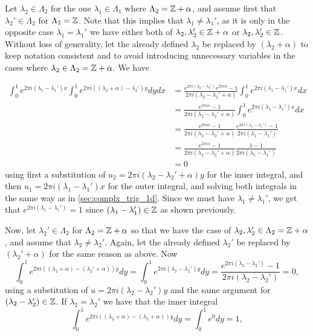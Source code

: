 \documentclass[../thesis.tex]{subfiles}
\begin{document}
Let $\lambda_2\in \Lambda_2$ for the one $\lambda_1\in\Lambda_1$ where $\Lambda_2=\mathbb{Z}+\alpha$, and assume first that $\lambda_2'\in \Lambda_2$ for $\Lambda_2 = \mathbb{Z}$. Note that this implies that $\lambda_1\neq\lambda_1'$, as it is only in the opposite case $\lambda_1 = \lambda_1'$ we have either both of $\lambda_2,\lambda_2' \in \mathbb{Z}+\alpha$ or $\lambda_2,\lambda_2' \in \mathbb{Z}$. Without loss of generality, let the already defined $\lambda_2$ be replaced by $(\lambda_2+\alpha)$ to keep notation consistent and to avoid introducing unnecessary variables in the cases where $\lambda_2 \in \Lambda_2 = \mathbb{Z}+\alpha$. We have

\begin{align*}
    \int_0^1e^{2\pi i  (\lambda_1- \lambda_1')x}\int_0^1  e^{2\pi i  ((\lambda_2+\alpha) - \lambda_2')y} dydx 
    &= \frac{e^{2\pi i (\lambda_2-\lambda_2')}e^{2\pi i \alpha}-1}{2\pi i (\lambda_2-\lambda_2'+\alpha)} \int_0^1e^{2\pi i  (\lambda_1- \lambda_1')x}dx\\ 
    &= \frac{e^{2\pi i \alpha}-1}{2\pi i (\lambda_2-\lambda_2'+\alpha)} \int_0^1e^{2\pi i  (\lambda_1- \lambda_1')x} dx\\ 
    &= \frac{e^{2\pi i \alpha}-1}{2\pi i (\lambda_2-\lambda_2'+\alpha)} \frac{e^{2\pi i (\lambda_1- \lambda_1')}-1}{2\pi i (\lambda_1- \lambda_1')}\\
    &= \frac{e^{2\pi i \alpha}-1}{2\pi i (\lambda_2-\lambda_2'+\alpha)} \frac{1-1}{2\pi i (\lambda_1- \lambda_1')}\\
    &= 0 
\end{align*}
using first a substitution of $u_2=2 \pi i (\lambda_2-\lambda_2'+\alpha)y$ for the inner integral, and then $u_1=2 \pi i (\lambda_1-\lambda_1')x$ for the outer integral, and solving both integrals in the same way as in \cref{sec:complx_trig_1d}. Since we must have $\lambda_1 \neq \lambda_1'$, we get that $e^{2\pi i (\lambda_1-\lambda_1')} = 1$ since $(\lambda_1-\lambda_1')\in \mathbb{Z}$ as shown previously. 


Now, let $\lambda_2'\in \Lambda_2$ for $\Lambda_2=\mathbb{Z}+\alpha$ so that we have the case of $\lambda_2,\lambda_2'\in \Lambda_2= \mathbb{Z}+\alpha$, and assume that $\lambda_2\neq\lambda_2'$. Again, let the already defined $\lambda_2'$ be replaced by $(\lambda_2'+\alpha)$ for the same reason as above. Now
\begin{equation*}
    \int_0^1  e^{2\pi i ((\lambda_2+\alpha) - (\lambda_2'+\alpha))y} dy = \int_0^1 e^{2\pi i  (\lambda_2 - \lambda_2')y} dy = \frac{e^{2\pi i (\lambda_2- \lambda_2')}-1}{2\pi i (\lambda_2- \lambda_2')} =0,
\end{equation*}
using a substitution of $u=2\pi i (\lambda_2-\lambda_2')y$ and the same argument for $(\lambda_2-\lambda_2') \in \mathbb{Z}$. If $\lambda_2 = \lambda_2'$ we have that the inner integral
\begin{equation*}
    \int_0^1  e^{2\pi i  ((\lambda_2+\alpha) - (\lambda_2+\alpha))y} dy =  \int_0^1 e^0 dy = 1,
\end{equation*}
\end{document}
